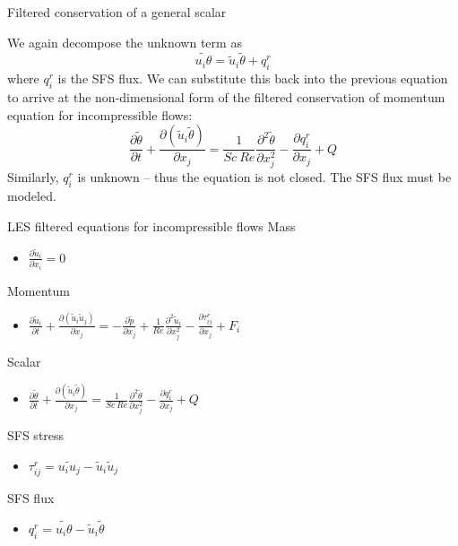 \begin{frame}{Filtered conservation of a general scalar}

We again decompose the unknown term as
$$\widetilde{u_i \theta} = \tilde u_i \tilde \theta + q_i^r$$
where $q_i^r$ is the SFS flux. 
\newline\newline We can substitute this back into the previous equation to arrive at the non-dimensional form of the filtered conservation of momentum equation for incompressible flows:
$$\boxed{\frac{\partial \tilde \theta}{\partial t} + \frac{\partial (\tilde u_i \tilde \theta)}{\partial x_j} = \frac{1}{Sc\ Re} \frac{\partial^2 \tilde \theta}{\partial x_j^{2}} -\frac{\partial q_i^r}{\partial x_j}+ Q}$$
Similarly, $q_i^r$ is unknown -- thus the equation is not closed. The SFS flux must be modeled.
\end{frame}


\begin{frame}{LES filtered equations for incompressible flows}
Mass
\begin{itemize}
	\item $\frac{\partial \tilde u_i}{\partial x_i} = 0$
\end{itemize}

Momentum
\begin{itemize}
\item $\frac{\partial \tilde u_i}{\partial t} + \frac{\partial (\tilde u_i \tilde u_j)}{\partial x_j} = - \frac{\partial \tilde p}{\partial x_j} + \frac{1}{Re} \frac{\partial^2 \tilde u_i}{\partial x_j^{2}} -\frac{\partial \tau_{ij}^r}{\partial x_j}+ F_i$
\end{itemize}

Scalar
\begin{itemize}
	\item $\frac{\partial \tilde \theta}{\partial t} + \frac{\partial (\tilde u_i \tilde \theta)}{\partial x_j} = \frac{1}{Sc\ Re} \frac{\partial^2 \tilde \theta}{\partial x_j^{2}} -\frac{\partial q_i^r}{\partial x_j}+ Q$
\end{itemize}

SFS stress
\begin{itemize}
	\item $\tau_{ij}^r = \widetilde{u_i u_j} - \tilde u_i \tilde u_j$
\end{itemize}

SFS flux
\begin{itemize}
	\item $q_{i}^r = \widetilde{u_i \theta} - \tilde u_i \tilde \theta$
\end{itemize}
\end{frame}

